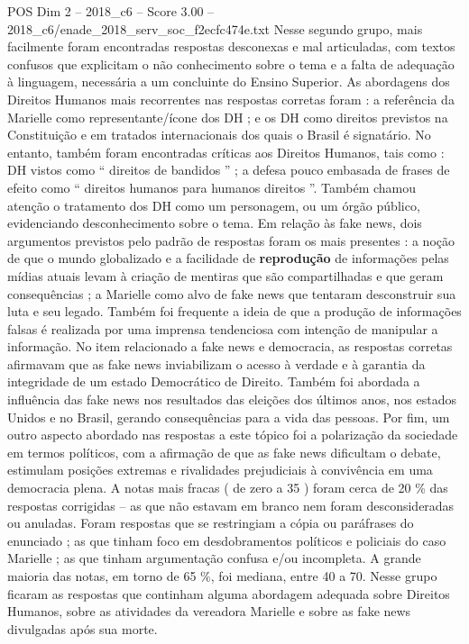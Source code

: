 \begin{textsample}{POS Dim 2 – 2018\_c6 – Score 3.00 – 2018\_c6/enade\_2018\_serv\_soc\_f2ecfc474e.txt}
Nesse segundo grupo, mais facilmente foram encontradas respostas desconexas e mal articuladas, com textos confusos que explicitam o não conhecimento sobre o tema e a falta de adequação à linguagem, necessária a um concluinte do Ensino Superior.
As abordagens dos Direitos Humanos mais recorrentes nas respostas corretas foram : a referência da Marielle como representante/ícone dos DH ; e os DH como direitos previstos na Constituição e em tratados internacionais dos quais o Brasil é signatário.
No entanto, também foram encontradas críticas aos Direitos Humanos, tais como : DH vistos como “ direitos de bandidos ” ; a defesa pouco embasada de frases de efeito como “ direitos humanos para humanos direitos ”.
Também chamou atenção o tratamento dos DH como um personagem, ou um órgão público, evidenciando desconhecimento sobre o tema.
Em relação às fake news, dois argumentos previstos pelo padrão de respostas foram os mais presentes : a noção de que o mundo globalizado e a facilidade de \textbf{reprodução} de informações pelas mídias atuais levam à criação de mentiras que são compartilhadas e que geram consequências ; a Marielle como alvo de fake news que tentaram desconstruir sua luta e seu legado.
Também foi frequente a ideia de que a produção de informações falsas é realizada por uma imprensa tendenciosa com intenção de manipular a informação.
No item relacionado a fake news e democracia, as respostas corretas afirmavam que as fake news inviabilizam o acesso à verdade e à garantia da integridade de um estado Democrático de Direito.
Também foi abordada a influência das fake news nos resultados das eleições dos últimos anos, nos estados Unidos e no Brasil, gerando consequências para a vida das pessoas.
Por fim, um outro aspecto abordado nas respostas a este tópico foi a polarização da sociedade em termos políticos, com a afirmação de que as fake news dificultam o debate, estimulam posições extremas e rivalidades prejudiciais à convivência em uma democracia plena.
A notas mais fracas ( de zero a 35 ) foram cerca de 20 \% das respostas corrigidas – as que não estavam em branco nem foram desconsideradas ou anuladas.
Foram respostas que se restringiam a cópia ou paráfrases do enunciado ; as que tinham foco em desdobramentos políticos e policiais do caso Marielle ; as que tinham argumentação confusa e/ou incompleta.
A grande maioria das notas, em torno de 65 \%, foi mediana, entre 40 a 70.
Nesse grupo ficaram as respostas que continham alguma abordagem adequada sobre Direitos Humanos, sobre as atividades da vereadora Marielle e sobre as fake news divulgadas após sua morte.

\end{textsample}

